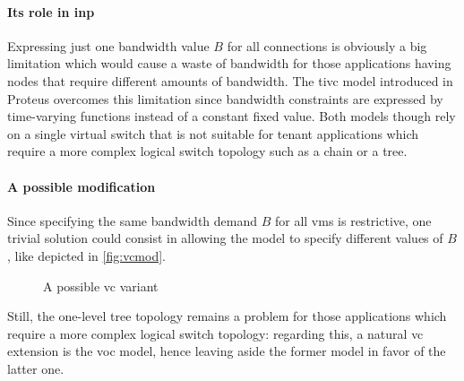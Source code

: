 %
%
\paragraph{Its role in \texorpdfstring{\gls{inp}}{INP}}
Expressing just one bandwidth value $B$ for all connections is obviously a big limitation which would cause a waste of bandwidth for those applications having nodes that require different amounts of bandwidth.
The \gls{tivc} model introduced in Proteus \cite{proteus} overcomes this limitation since bandwidth constraints are expressed by time-varying functions instead of a constant fixed value.
Both models though rely on a single virtual switch that is not suitable for tenant applications which require a more complex logical switch topology such as a chain or a tree.

\paragraph{A possible modification}
Since specifying the same bandwidth demand $B$ for all \glspl{vm} is restrictive, one trivial solution could consist in allowing the model to specify different values of $B$, like depicted in \autoref{fig:vcmod}.

\begin{figure}[!htb]
    \centering
    \usebox{\vcmodfigure}
    \caption{A possible \gls{vc} variant}
    \label{fig:vcmod}
\end{figure}

Still, the one-level tree topology remains a problem for those applications which require a more complex logical switch topology: regarding this, a natural \gls{vc} extension is the \gls{voc} model, hence leaving aside the former model in favor of the latter one.